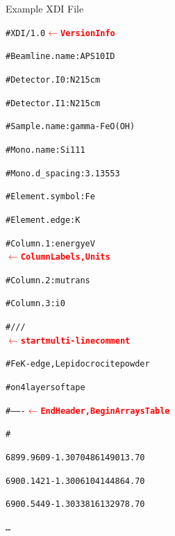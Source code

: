 \documentclass[final]{beamer}
\newcommand{\Color}[2]{{\textcolor{#1}{#2}}}
\newcommand{\BoldRed}[1]{{\Color{Red}{\bf{#1}}}}
\begin{document}
\begin{frame}{}
\begin{columns}[t]
      \begin{column}{.44\linewidth}
        \begin{block}{Example XDI File}
          \begin{center}
            \begin{minipage}[t]{0.95\linewidth}
              \begin{alltt}
                {\footnotesize
                  \#XDI/1.0  {\BoldRed{$\leftarrow$ Version Info}}\par
                  \#Beamline.name: APS 10ID\par
                  \#Detector.I0:  N2 15cm\par
                  \#Detector.I1:  N2 15cm\par
                  \#Sample.name: gamma-FeO(OH)\par
                  \#Mono.name:  Si 111\par
                  \#Mono.d\_spacing: 3.13553\par
                  \#Element.symbol: Fe\par
                  \#Element.edge: K\par
                  \#Column.1: energy eV
                  {\BoldRed{$\leftarrow$ Column Labels, Units}}\par
                  \#Column.2: mutrans\par
                  \#Column.3: i0\par
                  \#///
                  {\BoldRed{$\leftarrow$ start multi-line comment}}\par
                  \#Fe K-edge, Lepidocrocite powder\par
                  \#on 4 layers of tape\par
                  \#------- {\BoldRed{$\leftarrow$ End Header, Begin Arrays Table}}\par
                  \#\par
                  \hspace{3mm} 6899.9609 -1.3070486 149013.70\par
                  \hspace{3mm} 6900.1421 -1.3006104 144864.70\par
                  \hspace{3mm} 6900.5449 -1.3033816 132978.70\par
                  \hspace{3mm} \ldots\par
                }
              \end{alltt}
            \end{minipage}
          \end{center}
        \end{block}


\end{column}
\end{columns}
\end{frame}
\end{document}
